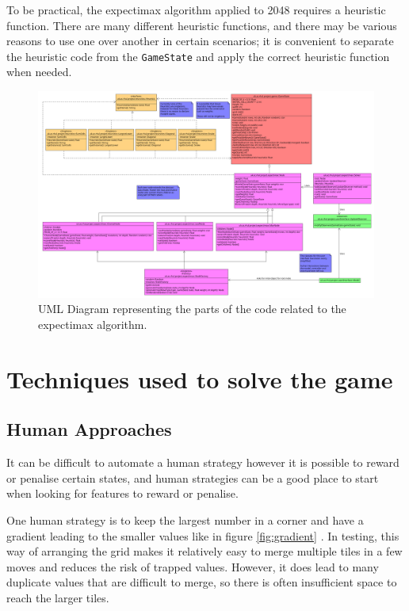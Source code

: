 \documentclass{article}
\begin{document}
To be practical, the expectimax algorithm applied to 2048 requires a heuristic function. There are many different heuristic functions, and there may be various reasons to use one over another in certain scenarios; it is convenient to separate the heuristic code from the \texttt{GameState} and apply the correct heuristic function when needed.

\begin{landscape}
\begin{figure}
    \centering
    \includegraphics[width=1.5\textwidth]{algorithm_uml.png}
    \caption{UML Diagram representing the parts of the code related to the expectimax algorithm.}
    \label{fig:alg_uml}
\end{figure}
\end{landscape}
\section{Techniques used to solve the game}
\label{sec:techniques}

\subsection{Human Approaches}
\label{subsec:human_techniques}
It can be difficult to automate a human strategy however it is possible to reward or penalise certain states, and human strategies can be a good place to start when looking for features to reward or penalise.

One human strategy is to keep the largest number in a corner and have a gradient leading to the smaller values like in figure \ref{fig:gradient} \cite{strategy2048}. In testing, this way of arranging the grid makes it relatively easy to merge multiple tiles in a few moves and reduces the risk of trapped values. However, it does lead to many duplicate values that are difficult to merge, so there is often insufficient space to reach the larger tiles.
\end{document}
